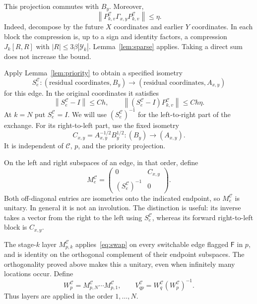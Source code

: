 \documentclass[11pt]{article}
\numberwithin{equation}{section}
\theoremstyle{definition}
\theoremstyle{remark}
\newcommand{\norm}[1]{\left\lVert#1\right\rVert}
\newcommand{\abs}[1]{\left\lvert#1\right\rvert}
\newcommand{\F}{\mathsf F}
\newcommand{\cY}{\mathcal Y}
\newcommand{\cC}{\mathcal C}
\begin{document}
This projection commutes with $B_y$. Moreover,
\begin{equation}\label{eq:compressed-gamma}
 \norm{P_{k,v}^{\cC}\Gamma_{x,y}P_{k,v}^{\cC}}\le\eta.
\end{equation}
Indeed, decompose by the future $X$ coordinates and earlier $Y$
coordinates. In each block the compression is, up to a sign and identity
factors, a compression $J_k[R,R]$ with $\abs R\le3\beta\abs{\cY_k}$.
Lemma~\ref{lem:sparse} applies. Taking a direct sum does not increase
the bound.

Apply Lemma~\ref{lem:priority} to obtain a specified isometry
\[
 S_e^{\cC}:(\text{residual coordinates},B_y)
                  \longrightarrow(\text{residual coordinates},A_{x,y})
\]
for this edge. In the original coordinates it satisfies
\begin{equation}\label{eq:edge-transfer}
 \norm{S_e^{\cC}-I}\le Ch,\qquad
 \norm{(S_e^{\cC}-I)P_{k,v}^{\cC}}\le Ch\eta.
\end{equation}
At $k=N$ put $S_e^{\cC}=I$. We will use $(S_e^{\cC})^{-1}$ for the
left-to-right part of the exchange. For its right-to-left part, use the
fixed isometry
\begin{equation}\label{eq:fixed-leg}
 C_{x,y}=A_{x,y}^{-1/2}B_y^{1/2}:(B_y)\longrightarrow(A_{x,y}).
\end{equation}
It is independent of $\cC$, $p$, and the priority projection.

On the left and right subspaces of an edge, in that order, define
\begin{equation}\label{eq:swap}
 M_e^{\cC}=
 \begin{pmatrix}0&C_{x,y}\\(S_e^{\cC})^{-1}&0\end{pmatrix}.
\end{equation}
Both off-diagonal entries are isometries onto the indicated endpoint, so
$M_e^{\cC}$ is unitary. In general it is not an involution. The distinction
is useful: its inverse takes a vector from the right to the left using
$S_e^{\cC}$, whereas its forward right-to-left block is $C_{x,y}$.

The stage-$k$ layer $M_{p,k}^{\cC}$ applies~\eqref{eq:swap} on every
switchable edge flagged $\F$ in $p$, and is identity on the orthogonal
complement of their endpoint subspaces. The orthogonality proved above
makes this a unitary, even when infinitely many locations occur. Define
\begin{equation}\label{eq:circuit}
 W_p^{\cC}=M_{p,N}^{\cC}\cdots M_{p,1}^{\cC},
 \qquad V_{qp}^{\cC}=W_q^{\cC}(W_p^{\cC})^{-1}.
\end{equation}
Thus layers are applied in the order $1,\ldots,N$.
\end{document}
